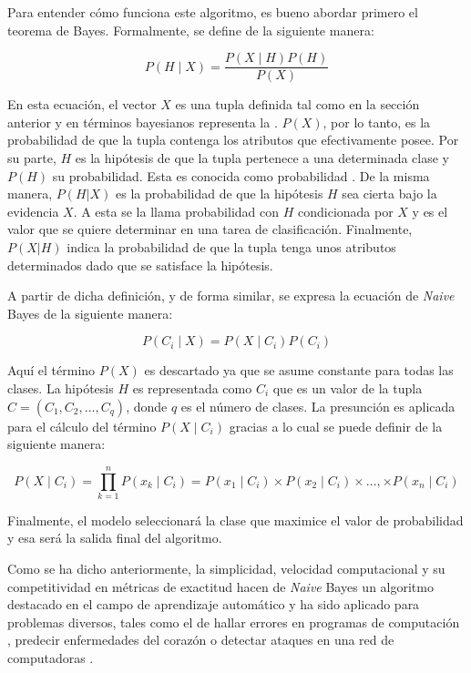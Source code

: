 Para entender cómo funciona este algoritmo, es bueno abordar primero  el teorema
de Bayes. Formalmente, se define de la siguiente manera:

\begin{equation}
	P(H \mid X) = \frac{P(X \mid H) P(H)}{P(X)}
\end{equation}

En esta ecuación, el vector $X$ es una tupla definida tal como en la sección
anterior y en términos bayesianos representa la . $P(X)$,
por lo tanto, es la probabilidad de que la tupla contenga los atributos que
efectivamente posee. Por su parte, $H$ es la hipótesis de que la tupla pertenece
a una determinada clase y $P(H)$ su probabilidad. Esta es conocida como
probabilidad . De la misma manera, $P(H|X)$ es la
probabilidad de que la hipótesis $H$ sea cierta bajo la evidencia $X$. A esta se
la llama probabilidad  con $H$ condicionada por $X$ y es
el valor que se quiere determinar en una tarea de clasificación.  Finalmente,
$P(X|H)$ indica la probabilidad de que la tupla tenga unos atributos
determinados dado que se satisface la hipótesis.

A partir de dicha definición, y de forma similar, se expresa la ecuación de
\textit{Naive} Bayes de la siguiente manera:

\begin{equation}
	P(C_{i} \mid X) = P(X \mid C_{i}) P(C_{i})
\end{equation}

Aquí el término $P(X)$ es descartado ya que se asume constante para todas las
clases. La hipótesis $H$ es representada como $C_{i}$ que es un valor de la
tupla $C=(C_{1},C_{2},\dots,C_{q})$, donde $q$ es el número de clases. La
presunción  es aplicada para el cálculo del término $P(X \mid
	C_{i})$ gracias a lo cual se puede definir de la siguiente manera:

\begin{equation}
	P(X \mid C_{i}) = \prod\limits_{k=1}^n{P(x_{k} \mid C_{i})} =
	P(x_{1} \mid C_{i}) \times
	P(x_{2} \mid C_{i}) \times \dots, \times
	P(x_{n} \mid C_{i})
\end{equation}

Finalmente, el modelo seleccionará la clase que maximice el valor de
probabilidad y esa será la salida final del algoritmo.

Como se ha dicho anteriormente, la simplicidad, velocidad computacional y su
competitividad en métricas de exactitud hacen de \textit{Naive} Bayes un
algoritmo destacado en el campo de aprendizaje automático
\cite{wickramasinghe_naive_2020} y ha sido aplicado para problemas diversos,
tales como el de hallar errores en programas de computación
\cite{arar_feature_2017}, predecir enfermedades del corazón
\cite{dulhare_prediction_2018} o detectar ataques en una red de computadoras
\cite{kalutarage_detecting_2015}.


